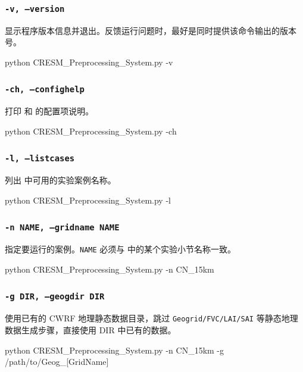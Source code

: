 \documentclass[UTF8,a4paper,11pt,fontset=none]{ctexart}
\begin{document}
\subsubsection{\texttt{-v,\ --version}}
显示程序版本信息并退出。反馈运行问题时，最好是同时提供该命令输出的版本号。
\begin{CPSCode} [leftmargin=2em,commandchars=\\\{\}]
    python CRESM_Preprocessing_System.py -v
\end{CPSCode}


\subsubsection{\texttt{-ch,\ --confighelp}}
打印  和  的配置项说明。
\begin{CPSCode} [leftmargin=2em,commandchars=\\\{\}]
    python CRESM_Preprocessing_System.py -ch
\end{CPSCode}


\subsubsection{\texttt{-l,\ --listcases}}
列出  中可用的实验案例名称。
\begin{CPSCode} [leftmargin=2em,commandchars=\\\{\}]
    python CRESM_Preprocessing_System.py -l
\end{CPSCode}


\subsubsection{\texttt{-n\ NAME,\ --gridname\ NAME}}
指定要运行的案例。\texttt{NAME} 必须与  中的某个实验小节名称一致。
\begin{CPSCode} [leftmargin=2em,commandchars=\\\{\}]
    python CRESM_Preprocessing_System.py -n CN_15km
\end{CPSCode}


\subsubsection{\texttt{-g\ DIR,\ --geogdir\ DIR}}
使用已有的 CWRF 地理静态数据目录，跳过 \texttt{Geogrid/FVC/LAI/SAI} 等静态地理数据生成步骤，直接使用 DIR 中已有的数据。 
\begin{CPSCode} [leftmargin=2em,commandchars=\\\{\}]
    python CRESM_Preprocessing_System.py -n CN_15km  -g /path/to/Geog_[GridName]
\end{CPSCode}
\end{document}
